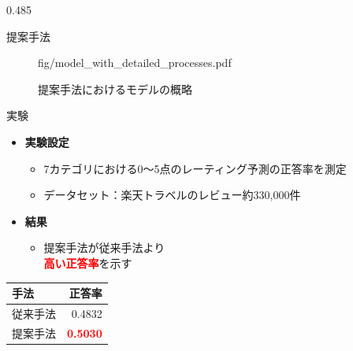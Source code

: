 \documentclass[unicode,10pt]{beamer}
\newcommand{\columnsize}{0.485\textwidth}
\newcommand{\itemtitle}[1]{\textbf{#1}\\}
\newcommand{\fire}[1]{\textcolor{red}{\textbf{#1}}}
\begin{document}
\begin{frame}
\begin{columns}[onlytextwidth,t]
\begin{column}{\columnsize}
\begin{block}{提案手法}
\begin{figure}
                      {fig/model_with_detailed_processes.pdf}
      \caption{提案手法におけるモデルの概略}
    \end{figure}
  \end{block}

  \begin{block}{実験}
    \begin{itemize}
      \item \itemtitle{実験設定}
        \begin{itemize}
          \item 7カテゴリにおける0〜5点のレーティング予測の正答率を測定
          \item データセット：楽天トラベルのレビュー約330,000件
        \end{itemize}
    \end{itemize}

    \begin{multicols}{2}
      \begin{itemize}
        \item \itemtitle{結果}
          \begin{itemize}
            \item 提案手法が従来手法より\\\fire{高い正答率}を示す
          \end{itemize}
      \end{itemize}
      \columnbreak
      \begin{table}
        \centering
        \begin{tabular}{l | r}
          手法 & 正答率 \\
          \hline
          従来手法\cite{fujitani15} & 0.4832 \\
          提案手法 & \fire{0.5030} \\
        \end{tabular}
      \end{table}
    \end{multicols}
  \end{block}


\end{column}
\end{columns}
\end{frame}
\end{document}
